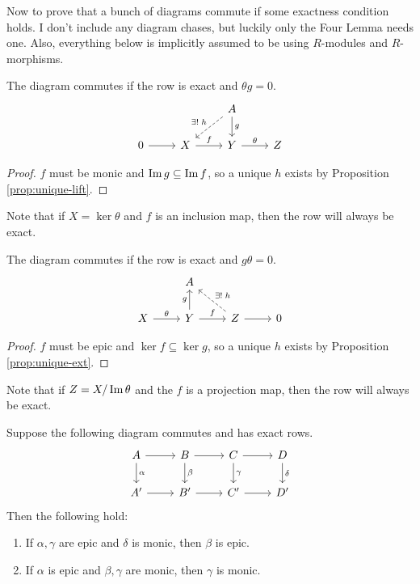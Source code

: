 \documentclass[twoside,10pt]{report}
\begin{document}
Now to prove that a bunch of diagrams commute if some exactness condition holds. I don't include any diagram chases, but luckily only the Four Lemma needs one. Also, everything below is implicitly assumed to be using $R$-modules and $R$-morphisms.
\begin{prop}
The diagram commutes if the row is exact and $\theta g= 0$.
\[
\begin{tikzcd}
	& & A \arrow[dl, dashed, "\exists! \;h"'] \dar{g} \\
	0 \rar & X \rar{f} & Y \rar{\theta} & Z
\end{tikzcd}
\] 
\end{prop}
\begin{proof}
	$f$ must be monic and $\operatorname{Im} g \subseteq \operatorname{Im} f$, so a unique $h$ exists by Proposition \ref{prop:unique-lift}.
\end{proof}

Note that if $X = \ker \theta$ and $f$ is an inclusion map, then the row will always be exact.

\begin{prop}
The diagram commutes if the row is exact and $g \theta=0$.
\[
\begin{tikzcd}
	& A \\
	X \rar{\theta} & Y \uar{g}\rar{f} & Z \rar\arrow[ul, dashed, "\exists!\; h"'] & 0
\end{tikzcd}
\] 
\end{prop}
\begin{proof}
	$f$ must be epic and $\ker f \subseteq \ker g$, so a unique $h$ exists by Proposition \ref{prop:unique-ext}.
\end{proof}

Note that if $Z = X / \operatorname{Im} \theta$ and the $f$ is a projection map, then the row will always be exact.

\begin{thrm}
Suppose the following diagram commutes and has exact rows.
\[
\begin{tikzcd}
	A \rar\dar{\alpha} & B \rar\dar{\beta} & C\rar\dar{\gamma} & D\dar{\delta} \\
	A'\rar & B'\rar & C'\rar & D'
\end{tikzcd}
\] Then the following hold:
\begin{enumerate}
	\item If $\alpha,\gamma$ are epic and $\delta$ is monic, then $\beta$ is epic.
	\item If $\alpha$ is epic and $\beta,\gamma$ are monic, then $\gamma$ is monic.
\end{enumerate}
\end{thrm}
\end{document}
